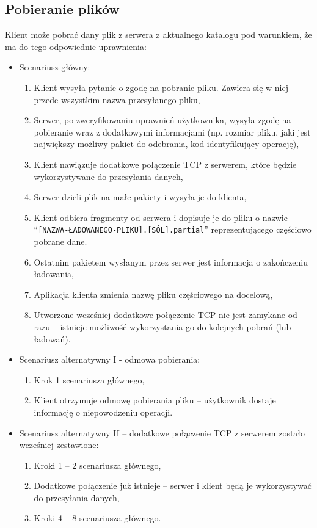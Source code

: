 \documentclass[10pt,a4paper]{article}
\newcommand{\quotes}[1]{``#1''}
\begin{document}
\subsection{Pobieranie plików}
\noindent Klient może pobrać dany plik z serwera z aktualnego katalogu pod warunkiem, że ma do tego odpowiednie uprawnienia:
\begin{itemize}
    \item Scenariusz główny:
    \begin{enumerate}
        \item Klient wysyła pytanie o zgodę na pobranie pliku. Zawiera się w niej przede wszystkim nazwa przesyłanego pliku,
        \item Serwer, po zweryfikowaniu uprawnień użytkownika, wysyła zgodę na pobieranie wraz z dodatkowymi informacjami (np. rozmiar pliku, jaki jest największy możliwy pakiet do odebrania, kod identyfikujący operację),
        \item Klient nawiązuje dodatkowe połączenie TCP z serwerem, które będzie wykorzystywane do przesyłania danych,
        \item Serwer dzieli plik na małe pakiety i wysyła je do klienta,
        \item Klient odbiera fragmenty od serwera i dopisuje je do pliku o nazwie \quotes{\texttt{[NAZWA-ŁADOWANEGO-PLIKU].[SÓL].partial}} reprezentującego częściowo pobrane dane.
        \item Ostatnim pakietem wysłanym przez serwer jest informacja o zakończeniu ładowania,
        \item Aplikacja klienta zmienia nazwę pliku częściowego na docelową,
        \item Utworzone wcześniej dodatkowe połączenie TCP nie jest zamykane od razu -- istnieje możliwość wykorzystania go do kolejnych pobrań (lub ładowań).
    \end{enumerate}
    
    \item Scenariusz alternatywny I - odmowa pobierania:
    \begin{enumerate}
        \item Krok 1 scenariusza głównego,
        \item Klient otrzymuje odmowę pobierania pliku -- użytkownik dostaje informację o niepowodzeniu operacji.
    \end{enumerate}
    
    \item Scenariusz alternatywny II -- dodatkowe połączenie TCP z serwerem zostało wcześniej zestawione:
    \begin{enumerate}
        \item Kroki 1 -- 2 scenariusza głównego,
        \item Dodatkowe połączenie już istnieje -- serwer i klient będą je wykorzystywać do przesyłania danych,
        \item Kroki 4 -- 8 scenariusza głównego.
    \end{enumerate}
    

\end{itemize}
\end{document}
